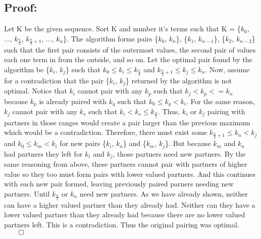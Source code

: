 \documentclass[11pt]{article}
\begin{document}
\subsection*{Proof:}
Let K be the given sequence. Sort K and number it's terms such that K = \{$k_0$, ..., $k_{\frac{n}{2}}$, $k_{\frac{n}{2}+1}$, ..., $k_n$\}. The algorithm forms pairs \{$k_0$, $k_n$\}, \{$k_1$, $k_{n-1}$\}, \{$k_2$, $k_{n-2}$\} such that the first pair consists of the outermost values, the second pair of values each one term in from the outside, and so on. Let the optimal pair found by the algorithm be \{$k_i$, $k_j$\} such that $k_0 \leq k_i \leq k_{\frac{n}{2}}$ and $k_{\frac{n}{2}+1} \leq k_j \leq k_n$. Now, assume for a contradiction that the pair \{$k_i$, $k_j$\} returned by the algorithm is not optimal. Notice that $k_i$ cannot pair with any $k_p$ such that $k_j < k_p <= k_n$ because $k_p$ is already paired with $k_q$ such that $k_0 \leq k_q < k_i$. For the same reason, $k_j$ cannot pair with any $k_s$ such that $k_i < k_s \leq k_{\frac{n}{2}}$. Thus, $k_i$ or $k_j$ pairing with partners in those ranges would create a pair larger than the previous maximum which would be a contradiction. Therefore, there must exist some $k_{\frac{n}{2}+1} \leq k_n < k_j$ and $k_0 \leq k_m < k_i$ for new pairs \{$k_i$, $k_n$\} and \{$k_m$, $k_j$\}. But because $k_m$ and $k_n$ had partners they left for $k_i$ and $k_j$, those partners need new partners. By the same reasoning from above, these partners cannot pair with partners of higher value so they too must form pairs with lower valued partners. And this continues with each new pair formed, leaving previously paired parners needing new partners. Until $k_{\frac{n}{2}}$ or $k_n$ need new partners. As we have already shown, neither can have a higher valued partner than they already had. Neither can they have a lower valued partner than they already had because there are no lower valued partners left. This is a contradiction. Thus the original pairing was optimal. $\qed$
\end{document}

